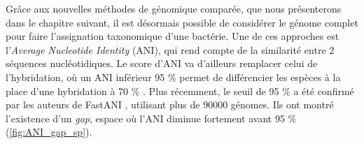 Grâce aux nouvelles méthodes de génomique comparée, que nous présenterons dans le chapitre suivant, il est désormais possible de considérer le génome complet pour faire l'assignation taxonomique d'une bactérie. Une de ces approches est l'\textit{Average Nucleotide Identity} (ANI), qui rend compte de la similarité entre 2 séquences nucléotidiques. Le score d'ANI va d'ailleurs remplacer celui de l'hybridation, où un ANI inférieur 95 \% permet de différencier les espèces à la place d'une hybridation à 70 \% \cite{goris_dnadna_2007}. Plus récemment, le seuil de 95 \% a été confirmé par les auteurs de FastANI \cite{jain_high_2018}, utilisant plus de 90000 génomes. Ils ont montré l'existence d'un \textit{gap}, espace où l'ANI diminue fortement avant 95 \% (\autoref{fig:ANI_gap_sp}).


\begin{figure}[htbp]
    \centering
    \hfill %
\end{figure}
